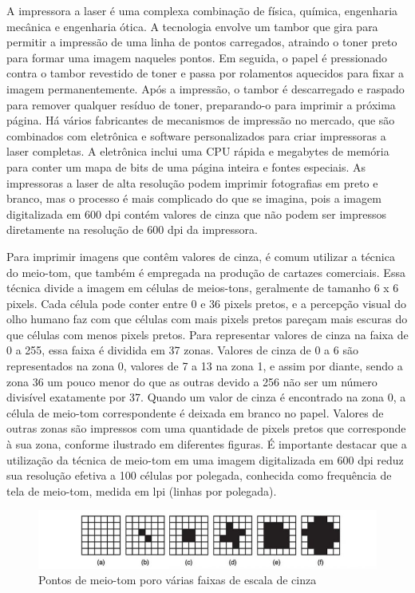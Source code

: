 \documentclass[12pt,a4, oneside, brazil]{article}
\begin{document}
		A impressora a laser é uma complexa combinação de física, química, engenharia mecânica e engenharia ótica. A tecnologia envolve um tambor que gira para permitir a impressão de uma linha de pontos carregados, atraindo o toner preto para formar uma imagem naqueles pontos. Em seguida, o papel é pressionado contra o tambor revestido de toner e passa por rolamentos aquecidos para fixar a imagem permanentemente. Após a impressão, o tambor é descarregado e raspado para remover qualquer resíduo de toner, preparando-o para imprimir a próxima página. Há vários fabricantes de mecanismos de impressão no mercado, que são combinados com eletrônica e software personalizados para criar impressoras a laser completas. A eletrônica inclui uma CPU rápida e megabytes de memória para conter um mapa de bits de uma página inteira e fontes especiais. As impressoras a laser de alta resolução podem imprimir fotografias em preto e branco, mas o processo é mais complicado do que se imagina, pois a imagem digitalizada em 600 dpi contém valores de cinza que não podem ser impressos diretamente na resolução de 600 dpi da impressora.
		
		Para imprimir imagens que contêm valores de cinza, é comum utilizar a técnica do meio-tom, que também é empregada na produção de cartazes comerciais. Essa técnica divide a imagem em células de meios-tons, geralmente de tamanho 6 x 6 pixels. Cada célula pode conter entre 0 e 36 pixels pretos, e a percepção visual do olho humano faz com que células com mais pixels pretos pareçam mais escuras do que células com menos pixels pretos. Para representar valores de cinza na faixa de 0 a 255, essa faixa é dividida em 37 zonas. Valores de cinza de 0 a 6 são representados na zona 0, valores de 7 a 13 na zona 1, e assim por diante, sendo a zona 36 um pouco menor do que as outras devido a 256 não ser um número divisível exatamente por 37. Quando um valor de cinza é encontrado na zona 0, a célula de meio-tom correspondente é deixada em branco no papel. Valores de outras zonas são impressos com uma quantidade de pixels pretos que corresponde à sua zona, conforme ilustrado em diferentes figuras. É importante destacar que a utilização da técnica de meio-tom em uma imagem digitalizada em 600 dpi reduz sua resolução efetiva a 100 células por polegada, conhecida como frequência de tela de meio-tom, medida em lpi (linhas por polegada).
		
				\begin{figure}[H]
					\centering
					\includegraphics[width=15cm]{cinza}
					\caption{Pontos de meio-tom poro várias faixas de escala de cinza}
					\label{fig:cinza}
				\end{figure}
		
\end{document}
